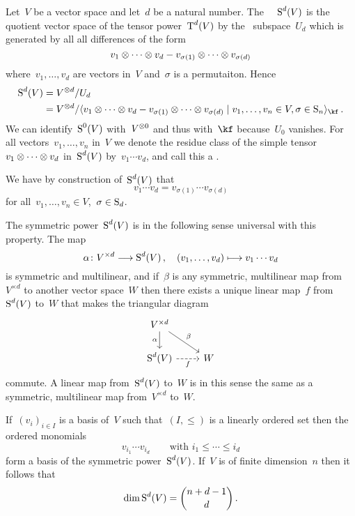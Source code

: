 \begin{recall}
  Let~$V$ be a vector space and let~$d$ be a natural number.
  The~{} ~$\operatorname{S}^d(V)$ is the quotient vector space of the tensor power~$\operatorname{T}^d(V)$ by the~{\linear{$\kf$}} subspace~$U_d$ which is generated by all all differences of the form
  \[
      v_1 \otimes \dotsb \otimes v_d
    - v_{\sigma(1)} \otimes \dotsb \otimes v_{\sigma(d)}
  \]
  where~$v_1, \dotsc, v_d$ are vectors in~$V$ and~$\sigma$ is a permutaiton.
  Hence
  \begin{align*}
    \Symm^d(V)
    &=
    V^{\tensor d} / U_d
    \\
    &=
    V^{\tensor d}
    /
    \gen{
        v_1 \tensor \dotsb \tensor v_d
      - v_{\sigma(1)} \tensor \dotsb \tensor v_{\sigma(d)} 
    \suchthat
      v_1, \dotsc, v_n \in V,
      \sigma \in \symm_n
    }_{\kf} \,.
  \end{align*}
  We can identify~$\operatorname{S}^0(V)$ with~$V^{\otimes 0}$ and thus with~$\kf$ because~$U_0$ vanishes.
  For all vectors~$v_1, \dotsc, v_n$ in~$V$ we denote the residue class of the simple tensor~$v_1 \otimes \dotsb \otimes v_d$ in~$\operatorname{S}^d(V)$ by~$v_1 \dotsm v_d$, and call this a .
  
  We have by construction of~$\operatorname{S}^d(V)$ that
  \[
    v_1 \dotsm v_d
    =
    v_{\sigma(1)} \dotsm v_{\sigma(d)}
  \]
  for all~$v_1, \dotsc, v_n \in V$,~$\sigma \in \operatorname{S}_d$.

  The symmetric power~$\operatorname{S}^d(V)$ is in the following sense universal with this property.
  The map
  \[
    \alpha
    \colon
    V^{\times d}
    \to
    \Symm^d(V)  \,,
    \quad
    (v_1, \dotsc, v_d)
    \mapsto
    v_1 \dotsm v_d
  \]
  is symmetric and multilinear, and if~$\beta$ is any symmetric, multilinear map from~$V^{\times d}$ to another vector space~$W$ then there exists a unique linear map~$f$ from~$\operatorname{S}^d(V)$ to~$W$ that makes the triangular diagram
  \[
    \begin{tikzcd}
      V^{\times d}
      \arrow{d}[left]{\alpha}
      \arrow{dr}[above right]{\beta}
      &
      {}
      \\
      \Symm^d(V)
      \arrow[dashed]{r}[below]{f}
      &
      W
    \end{tikzcd}
  \]
  commute.
  A linear map from~$\operatorname{S}^d(V)$ to~$W$ is in this sense the same as a symmetric, multilinear map from~$V^{\times d}$ to~$W$.
  
  If~$(v_i)_{i \in I}$ is a basis of~$V$ such that~$(I, \leq)$ is a linearly ordered set then the ordered monomials
  \[
    v_{i_1} \dotsm v_{i_d}
    \qquad
    \text{with~$i_1 \leq \dotsb \leq i_d$}
  \]
  form a basis of the symmetric power~$\operatorname{S}^d(V)$.
  If~$V$ is of finite dimension~$n$ then it follows that
  \[
    \dim \operatorname{S}^d(V)
    =
    \binom{n+d-1}{d}  \,.
  \]
\end{recall}



